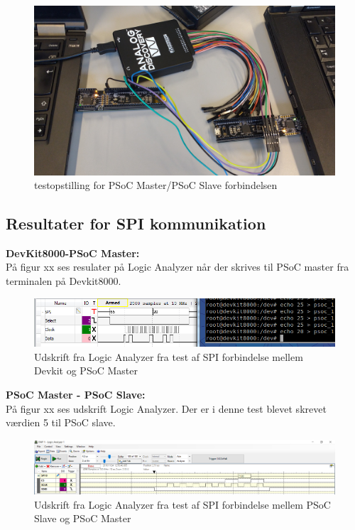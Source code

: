 \begin{figure}[H]
\includegraphics[scale=0.6]{tex/TeImRe/SPI/SPI_testAnalog}
\caption{testopstilling for PSoC Master/PSoC Slave forbindelsen}
\end{figure}

\subsection{Resultater for SPI kommunikation}
\textbf{DevKit8000-PSoC Master:}\\
På figur xx ses resulater på Logic Analyzer når der skrives til PSoC master fra terminalen på Devkit8000.

\begin{figure}[H]
\includegraphics[scale=0.6]{tex/TeImRe/SPI/Analog_devkit_echo_psoc_1}
\caption{Udskrift fra Logic Analyzer fra test af SPI forbindelse mellem Devkit og PSoC Master}
\end{figure}

\textbf{PSoC Master - PSoC Slave:} \\
På figur xx ses udskrift Logic Analyzer. Der er i denne test blevet skrevet værdien 5 til PSoC slave.

\begin{figure}[H]
\includegraphics[scale=0.6]{tex/TeImRe/SPI/Logic_analyzer}
\caption{Udskrift fra Logic Analyzer fra test af SPI forbindelse mellem PSoC Slave og PSoC Master}
\end{figure}

